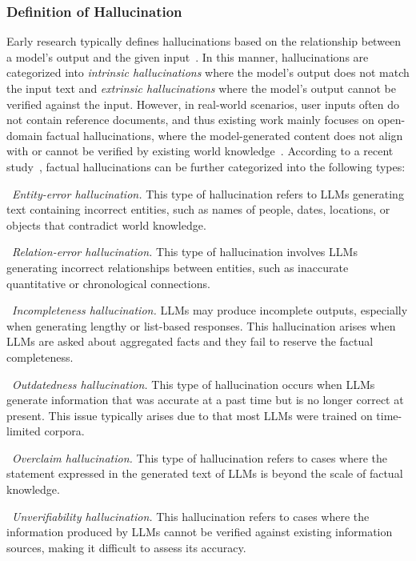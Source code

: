 \subsubsection{Definition of Hallucination} Early research typically defines hallucinations based on the relationship between a model's output and the given input~\cite{Ji-ACM-2023-survey}. In this manner, hallucinations are categorized into \emph{intrinsic hallucinations} where the model's output does not match the input text and \emph{extrinsic hallucinations} where the model's output cannot be verified against the input. However, in real-world scenarios, user inputs often do not contain reference documents, and thus existing work mainly focuses on open-domain factual hallucinations, where the model-generated content does not align with or cannot be verified by existing world knowledge~\cite{Zhang-CoRR-2023-Siren,Li-arxiv-2024-dawn}. According to a recent study~\cite{Li-arxiv-2024-dawn}, factual hallucinations can be further categorized into the following types:

\textbullet~\emph{Entity-error hallucination.} This type of hallucination refers to LLMs generating text containing incorrect entities, such as names of people, dates, locations, or objects that contradict world knowledge.

\textbullet~\emph{Relation-error hallucination.} This type of hallucination involves LLMs generating incorrect relationships between entities, such as inaccurate quantitative or chronological connections.

\textbullet~\emph{Incompleteness hallucination.} LLMs may produce incomplete outputs, especially when generating lengthy or list-based responses. This hallucination arises when LLMs are asked about aggregated facts and they fail to reserve the factual completeness.

\textbullet~\emph{Outdatedness hallucination.} This type of hallucination occurs when LLMs generate information that was accurate at a past time but is no longer correct at present. This issue typically arises due to that most LLMs were trained on time-limited corpora.

\textbullet~\emph{Overclaim hallucination.} This type of hallucination refers to cases where the statement expressed in the generated text of LLMs is beyond the scale of factual knowledge.

\textbullet~\emph{Unverifiability hallucination.} This hallucination refers to cases where the information produced by LLMs cannot be verified against existing information sources, making it difficult to assess its accuracy.

